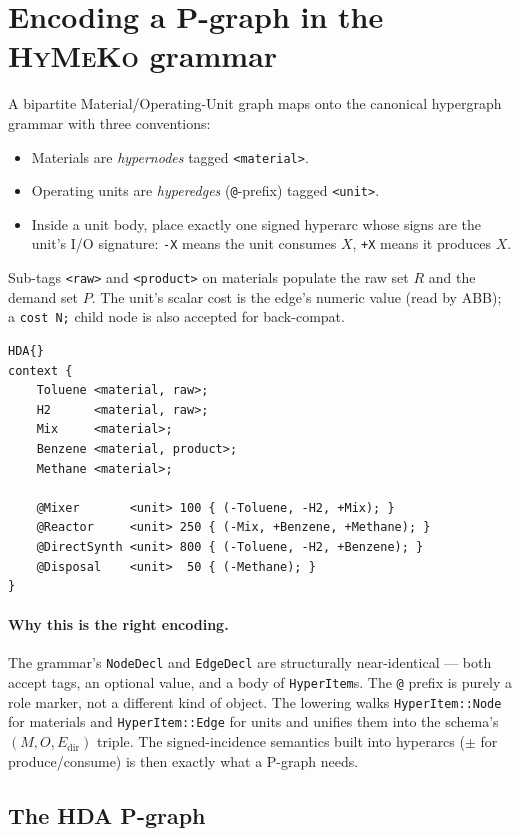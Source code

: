 \documentclass[11pt,a4paper]{article}
\newcommand{\HyMeKo}{\textsc{HyMeKo}}
\newcommand{\code}[1]{\texttt{\small #1}}
\begin{document}
\section{Encoding a P-graph in the \HyMeKo{} grammar}

A bipartite Material/Operating-Unit graph maps onto the canonical
hypergraph grammar with three conventions:
\begin{itemize}
\item Materials are \emph{hypernodes} tagged \code{<material>}.
\item Operating units are \emph{hyperedges}
  (\code{@}-prefix) tagged \code{<unit>}.
\item Inside a unit body, place exactly one signed hyperarc whose
  signs are the unit's I/O signature: \code{-X} means the unit
  consumes $X$, \code{+X} means it produces $X$.
\end{itemize}
Sub-tags \code{<raw>} and \code{<product>} on materials populate the
raw set $R$ and the demand set $P$. The unit's scalar cost is the
edge's numeric value (read by ABB); a \code{cost N;} child node is
also accepted for back-compat.

\begin{lstlisting}
HDA{}
context {
    Toluene <material, raw>;
    H2      <material, raw>;
    Mix     <material>;
    Benzene <material, product>;
    Methane <material>;

    @Mixer       <unit> 100 { (-Toluene, -H2, +Mix); }
    @Reactor     <unit> 250 { (-Mix, +Benzene, +Methane); }
    @DirectSynth <unit> 800 { (-Toluene, -H2, +Benzene); }
    @Disposal    <unit>  50 { (-Methane); }
}
\end{lstlisting}

\paragraph{Why this is the right encoding.} The grammar's
\code{NodeDecl} and \code{EdgeDecl} are structurally near-identical
--- both accept tags, an optional value, and a body of
\code{HyperItem}s. The \code{@} prefix is purely a role marker, not
a different kind of object. The lowering walks
\code{HyperItem::Node} for materials and \code{HyperItem::Edge} for
units and unifies them into the schema's $(M,O,E_{\mathrm{dir}})$
triple. The signed-incidence semantics built into hyperarcs
($\pm$ for produce/consume) is then exactly what a P-graph needs.

\subsection*{The HDA P-graph}
\end{document}
